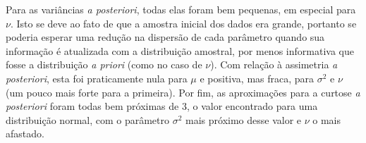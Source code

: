 Para as variâncias \textit{a posteriori}, todas elas foram bem pequenas, em especial para $\nu$. Isto se deve ao fato de que a amostra inicial dos dados era grande, portanto se poderia esperar uma redução na dispersão de cada parâmetro quando sua informação é atualizada com a distribuição amostral, por menos informativa que fosse a distribuição \textit{a priori} (como no caso de $\nu$). Com relação à assimetria \textit{a posteriori}, esta foi praticamente nula para $\mu$ e positiva, mas fraca, para $\sigma^2$ e $\nu$ (um pouco mais forte para a primeira). Por fim, as aproximações para a curtose \textit{a posteriori} foram todas bem próximas de 3, o valor encontrado para uma distribuição normal, com o parâmetro $\sigma^2$ mais próximo desse valor e $\nu$ o mais afastado.